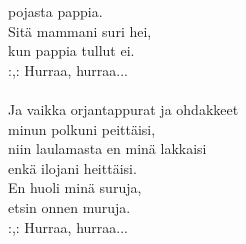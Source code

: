 pojasta pappia. \\ Sitä mammani suri hei, \\ kun pappia tullut ei. \\ :,: Hurraa, hurraa... \\ \hspace{10mm} \\ Ja vaikka orjantappurat ja ohdakkeet \\ minun polkuni peittäisi, \\ niin laulamasta en minä lakkaisi \\ enkä ilojani heittäisi. \\ En huoli minä suruja, \\ etsin onnen muruja. \\ :,: Hurraa, hurraa...